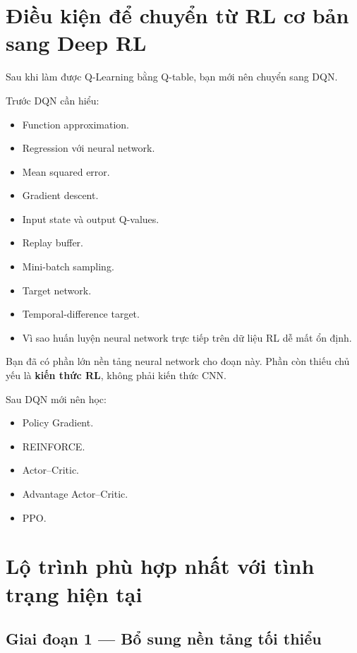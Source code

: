 \documentclass[12pt,a4paper]{article}
\begin{document}
\section{Điều kiện để chuyển từ RL cơ bản sang Deep RL}

Sau khi làm được Q-Learning bằng Q-table, bạn mới nên chuyển sang DQN.

Trước DQN cần hiểu:

\begin{itemize}[leftmargin=1.5em]
    \item Function approximation.
    \item Regression với neural network.
    \item Mean squared error.
    \item Gradient descent.
    \item Input state và output Q-values.
    \item Replay buffer.
    \item Mini-batch sampling.
    \item Target network.
    \item Temporal-difference target.
    \item Vì sao huấn luyện neural network trực tiếp trên dữ liệu RL dễ mất ổn định.
\end{itemize}

Bạn đã có phần lớn nền tảng neural network cho đoạn này. Phần còn thiếu chủ yếu là \textbf{kiến thức RL}, không phải kiến thức CNN.

Sau DQN mới nên học:

\begin{itemize}[leftmargin=1.5em]
    \item Policy Gradient.
    \item REINFORCE.
    \item Actor--Critic.
    \item Advantage Actor--Critic.
    \item PPO.
\end{itemize}

\section{Lộ trình phù hợp nhất với tình trạng hiện tại}

\subsection{Giai đoạn 1 --- Bổ sung nền tảng tối thiểu}
\end{document}

